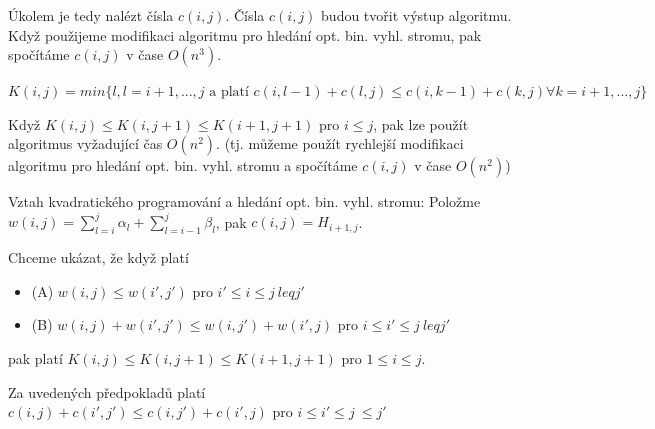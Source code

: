 Úkolem je tedy nalézt čísla $c(i,j)$.
Čísla $c(i,j)$ budou tvořit výstup algoritmu. Když použijeme modifikaci
algoritmu pro hledání opt. bin. vyhl. stromu, pak spočítáme $c(i,j)$ v
čase $O(n^3)$.
\par

\begin{defn}
$K(i,j) = min\{l, l=i+1, ..., j \text{ a platí }
c(i,l-1) + c(l,j) \leq c(i,k-1) + c(k,j) \forall k = i+1, ...,j\}$ 
\end{defn}

Když $K(i,j) \leq K(i,j+1) \leq K(i+1,j+1)$ pro $i \leq j$, pak lze použít
algoritmus vyžadující čas $O(n^2)$. (tj. můžeme použít rychlejší
modifikaci algoritmu pro hledání opt. bin. vyhl. stromu a
spočítáme $c(i,j)$ v čase $O(n^2)$)

\begin{pozn}
Vztah kvadratického programování a hledání opt. bin. vyhl. stromu:
Položme $w(i,j) = \sum_{l=i}^{j} \alpha_l + \sum_{l=i-1}^{j} \beta_l$, pak
$c(i,j) = H_{i+1,j}$.
\end{pozn}

\par
Chceme ukázat, že když platí

\begin{itemize}
\item (A) $w(i,j) \leq w(i',j')$ pro $i' \leq i \leq j \ leq j'$ 
\item (B) $w(i,j) + w(i',j') \leq w(i,j') + w(i',j)$ pro 
$i \leq i' \leq j \ leq j'$ 
\end{itemize}

pak platí 
$K(i,j) \leq K(i,j+1) \leq K(i+1,j+1)$ pro $1 \leq i \leq j$.

\begin{lemma}
Za uvedených předpokladů platí \\
$c(i,j) + c(i',j') \leq c(i,j') + c(i',j)$ pro $i \leq i' \leq j \ \leq j'$ 
\end{lemma}

